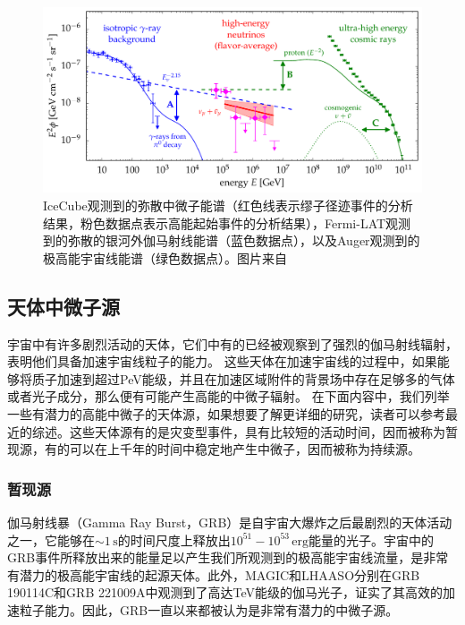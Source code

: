 \begin{figure}[htb]
    \centering
    \includegraphics[width=0.9\linewidth]{img/diffuse_neutrino_CR_gamma.pdf}
    \caption{IceCube观测到的弥散中微子能谱（红色线表示缪子径迹事件的分析结果\cite{IceCube_diffse_muon:2017}，粉色数据点表示高能起始事件的分析结果\cite{IceCube_6yr_cascade_spectrum:2017}），Fermi-LAT观测到的弥散的银河外伽马射线能谱（蓝色数据点）\cite{Fermi_diffuse_gamma:2014}，以及Auger观测到的极高能宇宙线能谱（绿色数据点）\cite{Auger_diffuse:2015}。图片来自\parencite{Astro2020_neutrino}}
    \label{fig:diffuse_neutrino_CR_gamma}
\end{figure}


\subsection{天体中微子源}

宇宙中有许多剧烈活动的天体，它们中有的已经被观察到了强烈的伽马射线辐射，表明他们具备加速宇宙线粒子的能力。
这些天体在加速宇宙线的过程中，如果能够将质子加速到超过PeV能级，并且在加速区域附件的背景场中存在足够多的气体或者光子成分，那么便有可能产生高能的中微子辐射。
在下面内容中，我们列举一些有潜力的高能中微子的天体源，如果想要了解更详细的研究，读者可以参考最近的综述\cite{Kurahashi_review_nu_mm:2022}。这些天体源有的是灾变型事件，具有比较短的活动时间，因而被称为暂现源，有的可以在上千年的时间中稳定地产生中微子，因而被称为持续源。

\subsubsection{暂现源}

伽马射线暴（Gamma Ray Burst，GRB）是自宇宙大爆炸之后最剧烈的天体活动之一，它能够在$\sim 1\,\mathrm{s}$的时间尺度上释放出$10^{51}-10^{53}\,\mathrm{erg}$能量的光子\cite{zhang:2018}。宇宙中的GRB事件所释放出来的能量足以产生我们所观测到的极高能宇宙线流量，是非常有潜力的极高能宇宙线的起源天体\cite{Waxman:1995}。此外，MAGIC和LHAASO分别在GRB 190114C和GRB 221009A中观测到了高达TeV能级的伽马光子\cite{MAGIC_GRB190114C:2019}，证实了其高效的加速粒子能力。因此，GRB一直以来都被认为是非常有潜力的中微子源\cite{Waxman:1997ti}。

